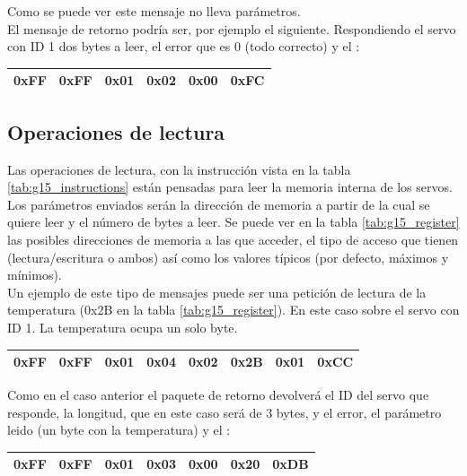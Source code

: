 	Como se puede ver este mensaje no lleva parámetros.
	\\

	El mensaje de retorno podría ser, por ejemplo el siguiente. Respondiendo el servo con ID 1 dos bytes a leer, el error que es 0 (todo correcto) y el :
	\begin{center}
		\begin{tabular}{|c|c|c|c|c|c|}
			\hline
			0xFF & 0xFF & 0x01 & 0x02 & 0x00 & 0xFC \\
			\hline
		\end{tabular}
	\end{center}

	\subsection{Operaciones de lectura}

	Las operaciones de lectura, con la instrucción  vista en la tabla \ref{tab:g15_instructions} están pensadas para leer la memoria interna de los servos. Los parámetros enviados serán la dirección de memoria a partir de la cual se quiere leer y el número de bytes a leer. Se puede ver en la tabla \ref{tab:g15_register} las posibles direcciones de memoria a las que acceder, el tipo de acceso que tienen (lectura/escritura o ambos) así como los valores típicos (por defecto, máximos y mínimos).
	\\

	Un ejemplo de este tipo de mensajes puede ser una petición de lectura de la temperatura (0x2B en la tabla \ref{tab:g15_register}). En este caso sobre el servo con ID 1. La temperatura ocupa un solo byte.

	\begin{center}
		\begin{tabular}{|c|c|c|c|c|c|c|c|}
			\hline
			0xFF & 0xFF & 0x01 & 0x04 & 0x02 & 0x2B & 0x01 & 0xCC \\
			\hline
		\end{tabular}
	\end{center}

	Como en el caso anterior el paquete de retorno devolverá el ID del servo que responde, la longitud, que en este caso será de 3 bytes, y el error, el parámetro leido (un byte con la temperatura) y el :

	\begin{center}
		\begin{tabular}{|c|c|c|c|c|c|c|}
			\hline
			0xFF & 0xFF & 0x01 & 0x03 & 0x00 & 0x20 & 0xDB \\
			\hline
		\end{tabular}
	\end{center}

